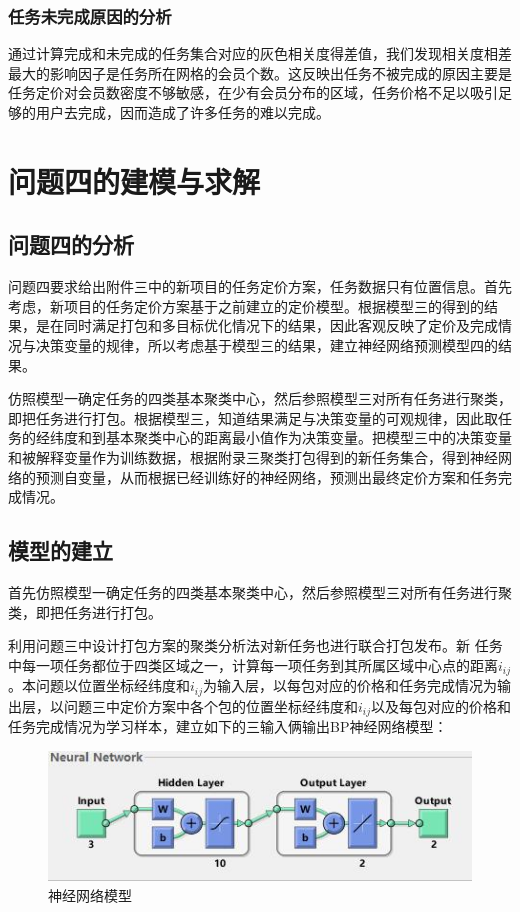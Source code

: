 \documentclass[withoutpreface,bwprint]{cumcmthesis} %
\begin{document}
\subsubsection{任务未完成原因的分析}
通过计算完成和未完成的任务集合对应的灰色相关度得差值，我们发现相关度相差最大的影响因子是任务所在网格的会员个数。这反映出任务不被完成的原因主要是任务定价对会员数密度不够敏感，在少有会员分布的区域，任务价格不足以吸引足够的用户去完成，因而造成了许多任务的难以完成。




\section{问题四的建模与求解}
\subsection{问题四的分析}
问题四要求给出附件三中的新项目的任务定价方案，任务数据只有位置信息。首先考虑，新项目的任务定价方案基于之前建立的定价模型。根据模型三的得到的结果，是在同时满足打包和多目标优化情况下的结果，因此客观反映了定价及完成情况与决策变量的规律，所以考虑基于模型三的结果，建立神经网络预测模型四的结果。

仿照模型一确定任务的四类基本聚类中心，然后参照模型三对所有任务进行聚类，即把任务进行打包。根据模型三，知道结果满足与决策变量的可观规律，因此取任务的经纬度和到基本聚类中心的距离最小值作为决策变量。把模型三中的决策变量和被解释变量作为训练数据，根据附录三聚类打包得到的新任务集合，得到神经网络的预测自变量，从而根据已经训练好的神经网络，预测出最终定价方案和任务完成情况。

\subsection{模型的建立}
首先仿照模型一确定任务的四类基本聚类中心，然后参照模型三对所有任务进行聚类，即把任务进行打包。

利用问题三中设计打包方案的聚类分析法对新任务也进行联合打包发布。新
任务中每一项任务都位于四类区域之一，计算每一项任务到其所属区域中心点的距离$i_{ij}$。本问题以位置坐标经纬度和$i_{ij}$为输入层，以每包对应的价格和任务完成情况为输出层，以问题三中定价方案中各个包的位置坐标经纬度和$i_{ij}$以及每包对应的价格和任务完成情况为学习样本，建立如下的三输入俩输出BP神经网络模型：
\begin{figure}[H]
    \centering
    \includegraphics[width=1\textwidth]{3.jpg}
    \caption{神经网络模型}
    \label{图}
\end{figure}
\end{document}

